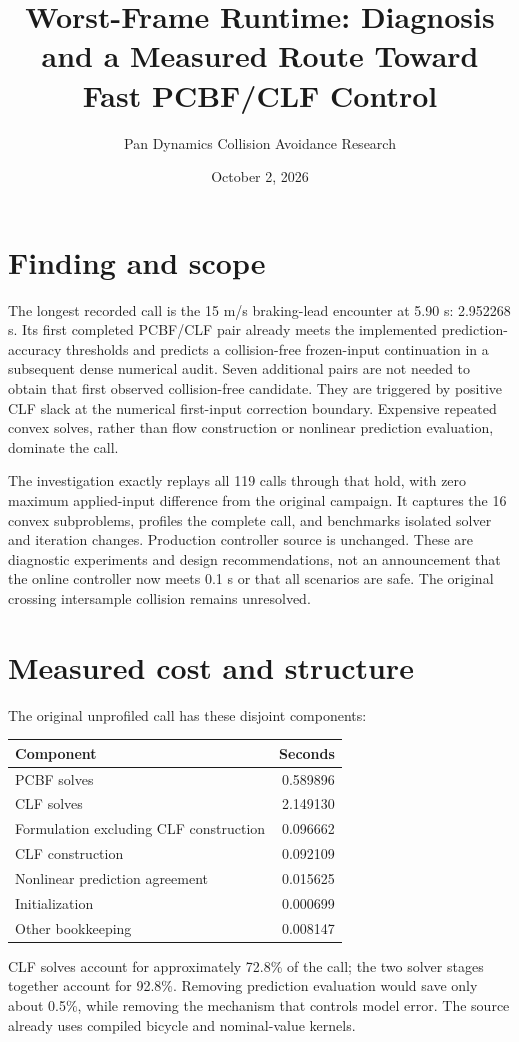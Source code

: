 \documentclass[11pt]{article}
\title{Worst-Frame Runtime: Diagnosis and a Measured Route Toward Fast PCBF/CLF Control}
\author{Pan Dynamics Collision Avoidance Research}
\date{October 2, 2026}
\begin{document}
\maketitle

\section{Finding and scope}
The longest recorded call is the 15 m/s braking-lead encounter at 5.90 s:
2.952268 s. Its first completed PCBF/CLF pair already meets the implemented
prediction-accuracy thresholds and predicts a collision-free frozen-input
continuation in a subsequent dense numerical audit. Seven additional pairs
are not needed to obtain that first observed collision-free candidate. They
are triggered by positive CLF slack at the numerical first-input correction
boundary. Expensive repeated convex solves, rather than flow construction
or nonlinear prediction evaluation, dominate the call.

The investigation exactly replays all 119 calls through that hold, with zero
maximum applied-input difference from the original campaign. It captures the
16 convex subproblems, profiles the complete call, and benchmarks isolated
solver and iteration changes. Production controller source is unchanged.
These are diagnostic experiments and design recommendations, not an
announcement that the online controller now meets 0.1 s or that all scenarios
are safe. The original crossing intersample collision remains unresolved.

\section{Measured cost and structure}
The original unprofiled call has these disjoint components:
\begin{center}\begin{tabular}{lr}\toprule Component & Seconds\\\midrule
PCBF solves & 0.589896\\
CLF solves & 2.149130\\
Formulation excluding CLF construction & 0.096662\\
CLF construction & 0.092109\\
Nonlinear prediction agreement & 0.015625\\
Initialization & 0.000699\\
Other bookkeeping & 0.008147\\\bottomrule\end{tabular}\end{center}
CLF solves account for approximately 72.8\% of the call; the two solver
stages together account for 92.8\%. Removing prediction evaluation would
save only about 0.5\%, while removing the mechanism that controls model error.
The source already uses compiled bicycle and nominal-value kernels.
\end{document}
